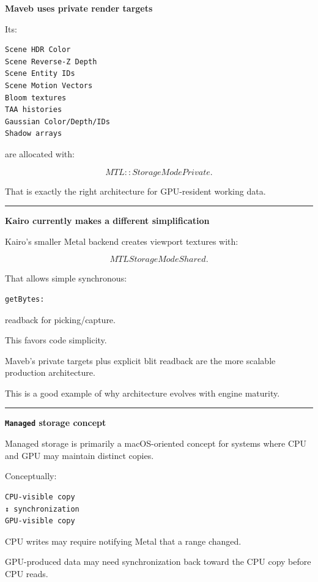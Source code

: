 \textbf{Maveb uses private render targets}

Its:

\begin{verbatim}
Scene HDR Color
Scene Reverse-Z Depth
Scene Entity IDs
Scene Motion Vectors
Bloom textures
TAA histories
Gaussian Color/Depth/IDs
Shadow arrays
\end{verbatim}

are allocated with:

\[
MTL::StorageModePrivate.
\]

That is exactly the right architecture for GPU-resident working data.

\begin{center}\rule{0.5\linewidth}{0.5pt}\end{center}

\textbf{Kairo currently makes a different simplification}

Kairo's smaller Metal backend creates viewport textures with:

\[
MTLStorageModeShared.
\]

That allows simple synchronous:

\begin{verbatim}
getBytes:
\end{verbatim}

readback for picking/capture.

This favors code simplicity.

Maveb's private targets plus explicit blit readback are the more scalable production architecture.

This is a good example of why architecture evolves with engine maturity.

\begin{center}\rule{0.5\linewidth}{0.5pt}\end{center}

\textbf{\texttt{Managed} storage concept}

Managed storage is primarily a macOS-oriented concept for systems where CPU and GPU may maintain distinct copies.

Conceptually:

\begin{verbatim}
CPU-visible copy
↕ synchronization
GPU-visible copy
\end{verbatim}

CPU writes may require notifying Metal that a range changed.

GPU-produced data may need synchronization back toward the CPU copy before CPU reads.

